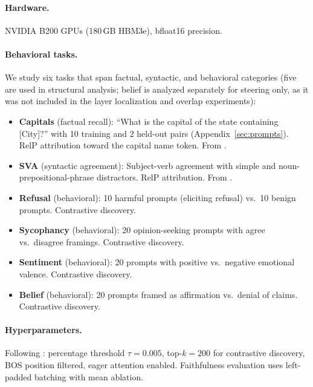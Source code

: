 \documentclass[11pt]{article}
\begin{document}
\paragraph{Hardware.}
NVIDIA B200 GPUs (180\,GB HBM3e), bfloat16 precision.

\paragraph{Behavioral tasks.}
We study six tasks that span factual, syntactic, and behavioral categories (five are used in structural analysis; belief is analyzed separately for steering only, as it was not included in the layer localization and overlap experiments):

\begin{itemize}[leftmargin=2em]
    \item \textbf{Capitals} (factual recall): ``What is the capital of the state containing [City]?'' with 10 training and 2 held-out pairs (Appendix~\ref{sec:prompts}). RelP attribution toward the capital name token. From \citet{arora2025circuits}.
    \item \textbf{SVA} (syntactic agreement): Subject-verb agreement with simple and noun-prepositional-phrase distractors. RelP attribution. From \citet{arora2025circuits}.
    \item \textbf{Refusal} (behavioral): 10 harmful prompts (eliciting refusal) vs.\ 10 benign prompts. Contrastive discovery.
    \item \textbf{Sycophancy} (behavioral): 20 opinion-seeking prompts with agree vs.\ disagree framings. Contrastive discovery.
    \item \textbf{Sentiment} (behavioral): 20 prompts with positive vs.\ negative emotional valence. Contrastive discovery.
    \item \textbf{Belief} (behavioral): 20 prompts framed as affirmation vs.\ denial of claims. Contrastive discovery.
\end{itemize}

\paragraph{Hyperparameters.}
Following \citet{arora2025circuits}: percentage threshold $\tau{=}0.005$, top-$k = 200$ for contrastive discovery, BOS position filtered, eager attention enabled.
Faithfulness evaluation uses left-padded batching with mean ablation.


\end{document}
